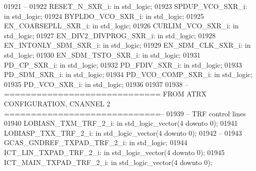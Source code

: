 \begin{DoxyCode}
01921 \textcolor{keyword}{    --}
01922     RESET\_N\_SXR\_i:  \textcolor{keywordflow}{in} \textcolor{comment}{std\_logic};
01923     SPDUP\_VCO\_SXR\_i:    \textcolor{keywordflow}{in} \textcolor{comment}{std\_logic};
01924     BYPLDO\_VCO\_SXR\_i:   \textcolor{keywordflow}{in} \textcolor{comment}{std\_logic};
01925     EN\_COARSEPLL\_SXR\_i: \textcolor{keywordflow}{in} \textcolor{comment}{std\_logic};
01926     CURLIM\_VCO\_SXR\_i:   \textcolor{keywordflow}{in} \textcolor{comment}{std\_logic};
01927     EN\_DIV2\_DIVPROG\_SXR\_i:  \textcolor{keywordflow}{in} \textcolor{comment}{std\_logic};
01928     EN\_INTONLY\_SDM\_SXR\_i:   \textcolor{keywordflow}{in} \textcolor{comment}{std\_logic};
01929     EN\_SDM\_CLK\_SXR\_i:   \textcolor{keywordflow}{in} \textcolor{comment}{std\_logic};
01930     EN\_SDM\_TSTO\_SXR\_i:  \textcolor{keywordflow}{in} \textcolor{comment}{std\_logic};
01931     PD\_CP\_SXR\_i:    \textcolor{keywordflow}{in} \textcolor{comment}{std\_logic};
01932     PD\_FDIV\_SXR\_i:  \textcolor{keywordflow}{in} \textcolor{comment}{std\_logic};
01933     PD\_SDM\_SXR\_i:   \textcolor{keywordflow}{in} \textcolor{comment}{std\_logic};
01934     PD\_VCO\_COMP\_SXR\_i:  \textcolor{keywordflow}{in} \textcolor{comment}{std\_logic};
01935     PD\_VCO\_SXR\_i:   \textcolor{keywordflow}{in} \textcolor{comment}{std\_logic};
01936 
01937 
01938 \textcolor{keyword}{    --============================= FROM ATRX CONFIGURATION, CNANNEL 2 =============================--}
01939 \textcolor{keyword}{    -- TRF control lines}
01940     LOBIASN\_TXM\_TRF\_2\_i:    \textcolor{keywordflow}{in} \textcolor{comment}{std\_logic\_vector}(\textcolor{vhdllogic}{}\textcolor{vhdllogic}{4} \textcolor{keywordflow}{downto} \textcolor{vhdllogic}{}\textcolor{vhdllogic}{0});
01941     LOBIASP\_TXX\_TRF\_2\_i:    \textcolor{keywordflow}{in} \textcolor{comment}{std\_logic\_vector}(\textcolor{vhdllogic}{}\textcolor{vhdllogic}{4} \textcolor{keywordflow}{downto} \textcolor{vhdllogic}{}\textcolor{vhdllogic}{0});
01942 \textcolor{keyword}{    --}
01943     GCAS\_GNDREF\_TXPAD\_TRF\_2\_i:  \textcolor{keywordflow}{in} \textcolor{comment}{std\_logic};
01944     ICT\_LIN\_TXPAD\_TRF\_2\_i:  \textcolor{keywordflow}{in} \textcolor{comment}{std\_logic\_vector}(\textcolor{vhdllogic}{}\textcolor{vhdllogic}{4} \textcolor{keywordflow}{downto} \textcolor{vhdllogic}{}\textcolor{vhdllogic}{0});
01945     ICT\_MAIN\_TXPAD\_TRF\_2\_i: \textcolor{keywordflow}{in} \textcolor{comment}{std\_logic\_vector}(\textcolor{vhdllogic}{}\textcolor{vhdllogic}{4} \textcolor{keywordflow}{downto} \textcolor{vhdllogic}{}\textcolor{vhdllogic}{0});

\end{DoxyCode}
